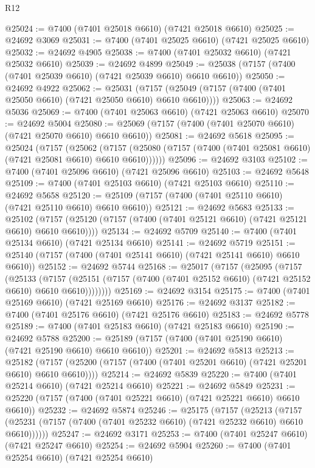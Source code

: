 \begin{lexlean}{R12}
\begin{coremodule}
{{{{{{{{{{{{{{{{{{{{{{{{{{{{{{{{{{{{{{{{{{{{{{{{{{{{{{{{{{{{{{{{{{{{{{{{{{{{{{{{{{@25024 := @7400 (@7401 @25018 @6610) (@7421 @25018 @6610)
@25025 := @24692 @3069
@25031 := @7400 (@7401 @25025 @6610) (@7421 @25025 @6610)
@25032 := @24692 @4905
@25038 := @7400 (@7401 @25032 @6610) (@7421 @25032 @6610)
@25039 := @24692 @4899
@25049 := @25038 (@7157 (@7400 (@7401 @25039 @6610) (@7421 @25039 @6610) @6610 @6610))
@25050 := @24692 @4922
@25062 := @25031
    (@7157 (@25049 (@7157 (@7400 (@7401 @25050 @6610) (@7421 @25050 @6610) @6610 @6610))))
@25063 := @24692 @5036
@25069 := @7400 (@7401 @25063 @6610) (@7421 @25063 @6610)
@25070 := @24692 @5004
@25080 := @25069 (@7157 (@7400 (@7401 @25070 @6610) (@7421 @25070 @6610) @6610 @6610))
@25081 := @24692 @5618
@25095 := @25024
    (@7157
      (@25062
        (@7157 (@25080 (@7157 (@7400 (@7401 @25081 @6610) (@7421 @25081 @6610) @6610 @6610))))))
@25096 := @24692 @3103
@25102 := @7400 (@7401 @25096 @6610) (@7421 @25096 @6610)
@25103 := @24692 @5648
@25109 := @7400 (@7401 @25103 @6610) (@7421 @25103 @6610)
@25110 := @24692 @5658
@25120 := @25109 (@7157 (@7400 (@7401 @25110 @6610) (@7421 @25110 @6610) @6610 @6610))
@25121 := @24692 @5683
@25133 := @25102
    (@7157 (@25120 (@7157 (@7400 (@7401 @25121 @6610) (@7421 @25121 @6610) @6610 @6610))))
@25134 := @24692 @5709
@25140 := @7400 (@7401 @25134 @6610) (@7421 @25134 @6610)
@25141 := @24692 @5719
@25151 := @25140 (@7157 (@7400 (@7401 @25141 @6610) (@7421 @25141 @6610) @6610 @6610))
@25152 := @24692 @5744
@25168 := @25017
    (@7157
      (@25095
        (@7157
          (@25133
            (@7157
              (@25151 (@7157 (@7400 (@7401 @25152 @6610) (@7421 @25152 @6610) @6610 @6610))))))))
@25169 := @24692 @3154
@25175 := @7400 (@7401 @25169 @6610) (@7421 @25169 @6610)
@25176 := @24692 @3137
@25182 := @7400 (@7401 @25176 @6610) (@7421 @25176 @6610)
@25183 := @24692 @5778
@25189 := @7400 (@7401 @25183 @6610) (@7421 @25183 @6610)
@25190 := @24692 @5788
@25200 := @25189 (@7157 (@7400 (@7401 @25190 @6610) (@7421 @25190 @6610) @6610 @6610))
@25201 := @24692 @5813
@25213 := @25182
    (@7157 (@25200 (@7157 (@7400 (@7401 @25201 @6610) (@7421 @25201 @6610) @6610 @6610))))
@25214 := @24692 @5839
@25220 := @7400 (@7401 @25214 @6610) (@7421 @25214 @6610)
@25221 := @24692 @5849
@25231 := @25220 (@7157 (@7400 (@7401 @25221 @6610) (@7421 @25221 @6610) @6610 @6610))
@25232 := @24692 @5874
@25246 := @25175
    (@7157
      (@25213
        (@7157 (@25231 (@7157 (@7400 (@7401 @25232 @6610) (@7421 @25232 @6610) @6610 @6610))))))
@25247 := @24692 @3171
@25253 := @7400 (@7401 @25247 @6610) (@7421 @25247 @6610)
@25254 := @24692 @5904
@25260 := @7400 (@7401 @25254 @6610) (@7421 @25254 @6610)
}}}}}}}}}}}}}}}}}}}}}}}}}}}}}}}}}}}}}}}}}}}}}}}}}}}}}}}}}}}}}}}}}}}}}}}}}}}}}}}}}}
\end{coremodule}
\end{lexlean}
